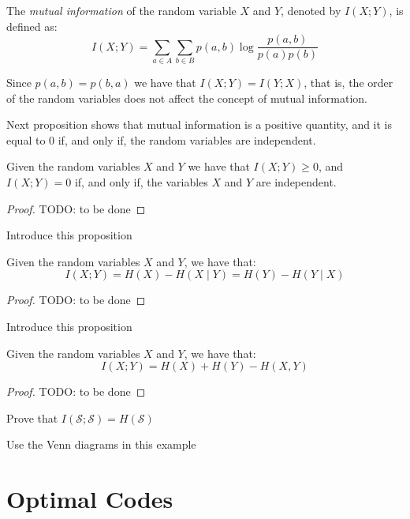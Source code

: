 \begin{definition}
The \emph{mutual information} of the random variable $X$ and $Y$, denoted by $I(X ; Y)$, is defined as:
\[
I(X ; Y) = \sum_{a \in A} \sum_{b \in B} p(a, b) \log \frac{p(a, b)}{p(a) p(b)}
\]
\end{definition}

Since $p(a, b) = p(b, a)$ we have that $I(X ; Y) = I(Y ; X)$, that is, the order of the random variables does not affect the concept of mutual information.

Next proposition shows that mutual information is a positive quantity, and it is equal to 0 if, and only if, the random variables are independent.

\begin{proposition}
Given the random variables $X$ and $Y$ we have that $I(X ; Y) \geq 0$, and $I(X ; Y) = 0$ if, and only if, the variables $X$ and $Y$ are independent.
\end{proposition}
\begin{proof}
{\color{red} TODO: to be done}
\end{proof}

{\color{red} Introduce this proposition}

\begin{proposition}
Given the random variables $X$ and $Y$, we have that:
\[
I(X;Y) = H(X) - H(X \mid Y) = H(Y) - H(Y \mid X)
\]
\end{proposition}
\begin{proof}
{\color{red} TODO: to be done}
\end{proof}

{\color{red} Introduce this proposition}

\begin{proposition}
Given the random variables $X$ and $Y$, we have that:
\[
I(X;Y) = H(X) + H(Y) - H(X, Y)
\]
\end{proposition}
\begin{proof}
{\color{red} TODO: to be done}
\end{proof}

{\color{red} Prove that $I(\mathcal{S}; \mathcal{S}) = H(\mathcal{S})$}

{\color{red} Use the Venn diagrams in this example}

\begin{example}
\end{example}

%
%

\section{Optimal Codes}
\label{sec:Optimal-Codes}

